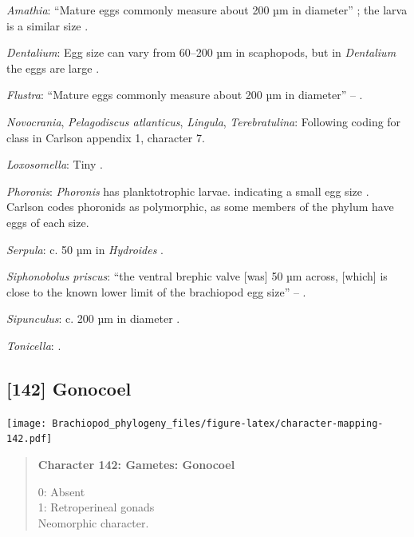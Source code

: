 \documentclass[openany]{book}
\begin{document}
\hypertarget{Amathia-coding-141}{}
\emph{Amathia}: ``Mature eggs commonly measure about 200 µm in
diameter'' \citep{Franzen1977}; the larva is a similar size
\citep{Reed1982}.

\hypertarget{Dentalium-coding-141}{}
\emph{Dentalium}: Egg size can vary from 60--200 µm in scaphopods, but
in \emph{Dentalium} the eggs are large \citep{DufresneDube1983}.

\hypertarget{Flustra-coding-141}{}
\emph{Flustra}: ``Mature eggs commonly measure about 200 µm in
diameter'' -- \citet{Franzen1977}.

\hypertarget{Lingula-coding-141}{}
\emph{Novocrania}, \emph{Pelagodiscus atlanticus}, \emph{Lingula},
\emph{Terebratulina}: Following coding for class in Carlson
\citeyearpar{Carlson1995Phylogeneticrelationships} appendix 1, character
7.

\hypertarget{Loxosomella-coding-141}{}
\emph{Loxosomella}: Tiny \citep{Nielsen1966}.

\hypertarget{Phoronis-coding-141}{}
\emph{Phoronis}: \emph{Phoronis} has planktotrophic larvae. indicating a
small egg size \citep{Ruppert2004Invertebratezoology}. Carlson
\citeyearpar{Carlson1995Phylogeneticrelationships} codes phoronids as
polymorphic, as some members of the phylum have eggs of each size.

\hypertarget{Serpula-coding-141}{}
\emph{Serpula}: c. 50 µm in \emph{Hydroides} \citep{Miles2007}.

\hypertarget{Siphonobolus_priscus-coding-141}{}
\emph{Siphonobolus priscus}: ``the ventral brephic valve {[}was{]} 50 µm
across, {[}which{]} is close to the known lower limit of the brachiopod
egg size'' -- \citet{Popov2009Earlyontogeny}.

\hypertarget{Sipunculus-coding-141}{}
\emph{Sipunculus}: c. 200 µm in diameter \citep{Rice1988}.

\hypertarget{Tonicella-coding-141}{}
\emph{Tonicella}: \citet{BucklandNicks1988}.

\subsection*{{[}142{]} Gonocoel}\label{gonocoel}

\texttt{[image: Brachiopod\_phylogeny\_files/figure-latex/character-mapping-142.pdf]}

\begin{quote}
\textbf{Character 142: Gametes: Gonocoel}

0: Absent\\
1: Retroperineal gonads\\
Neomorphic character.
\end{quote}
\end{document}
